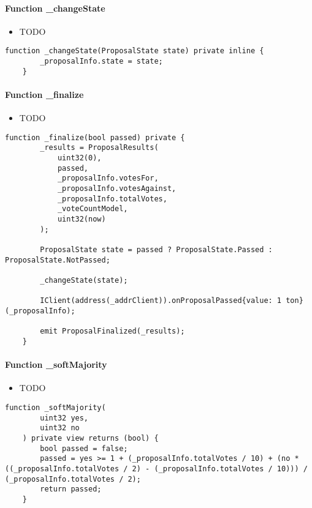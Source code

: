 \paragraph{Function \_{}changeState}

\begin{itemize}
\item TODO
\end{itemize}

\begin{lstlisting}[firstnumber=150]
    function _changeState(ProposalState state) private inline {
        _proposalInfo.state = state;
    }
\end{lstlisting}

\paragraph{Function \_{}finalize}

\begin{itemize}
\item TODO
\end{itemize}

\begin{lstlisting}[firstnumber=81]
    function _finalize(bool passed) private {
        _results = ProposalResults(
            uint32(0),
            passed,
            _proposalInfo.votesFor,
            _proposalInfo.votesAgainst,
            _proposalInfo.totalVotes,
            _voteCountModel,
            uint32(now)
        );

        ProposalState state = passed ? ProposalState.Passed : ProposalState.NotPassed;

        _changeState(state);

        IClient(address(_addrClient)).onProposalPassed{value: 1 ton} (_proposalInfo);

        emit ProposalFinalized(_results);
    }
\end{lstlisting}

\paragraph{Function \_{}softMajority}

\begin{itemize}
\item TODO
\end{itemize}

\begin{lstlisting}[firstnumber=141]
    function _softMajority(
        uint32 yes,
        uint32 no
    ) private view returns (bool) {
        bool passed = false;
        passed = yes >= 1 + (_proposalInfo.totalVotes / 10) + (no * ((_proposalInfo.totalVotes / 2) - (_proposalInfo.totalVotes / 10))) / (_proposalInfo.totalVotes / 2);
        return passed;
    }
\end{lstlisting}

